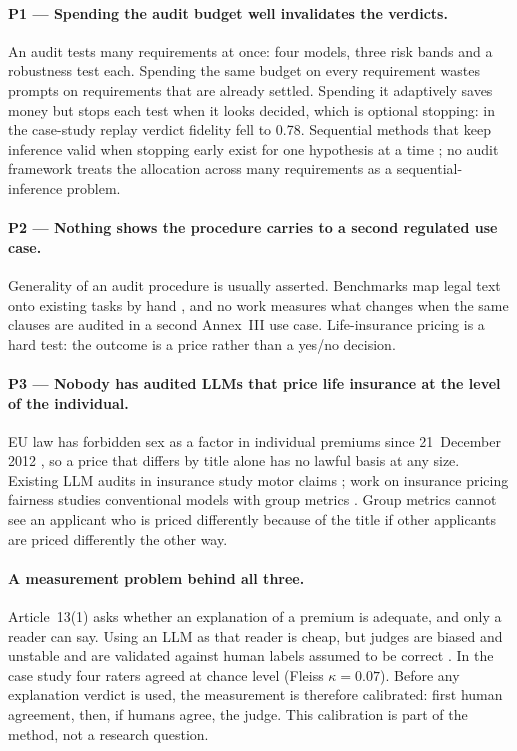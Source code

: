 \paragraph{P1 --- Spending the audit budget well invalidates the verdicts.}\hspace{0.6em}An audit tests many requirements at once: four models, three risk bands and a robustness test each. Spending the same budget on every requirement wastes prompts on requirements that are already settled. Spending it adaptively saves money but stops each test when it looks decided, which is optional stopping: in the case-study replay verdict fidelity fell to 0.78. Sequential methods that keep inference valid when stopping early exist for one hypothesis at a time \citep{obrien1979,landemets,howard,chugg2023}; no audit framework treats the allocation across many requirements as a sequential-inference problem.

\paragraph{P2 --- Nothing shows the procedure carries to a second regulated use case.}\hspace{0.6em}Generality of an audit procedure is usually asserted. Benchmarks map legal text onto existing tasks by hand \citep{complai}, and no work measures what changes when the same clauses are audited in a second Annex~III use case. Life-insurance pricing is a hard test: the outcome is a price rather than a yes/no decision.

\paragraph{P3 --- Nobody has audited LLMs that price life insurance at the level of the individual.}\hspace{0.6em}EU law has forbidden sex as a factor in individual premiums since 21~December 2012 \citep{testachats}, so a price that differs by title alone has no lawful basis at any size. Existing LLM audits in insurance study motor claims \citep{huang2026binary}; work on insurance pricing fairness studies conventional models with group metrics \citep{gupta2025,lindholm2022}. Group metrics cannot see an applicant who is priced differently because of the title if other applicants are priced differently the other way.

\paragraph{A measurement problem behind all three.}\hspace{0.6em}Article~13(1) asks whether an explanation of a premium is adequate, and only a reader can say. Using an LLM as that reader is cheap, but judges are biased and unstable \citep{zheng,wang2023fair,schroeder2024} and are validated against human labels assumed to be correct \citep{calderon2025,bavaresco2025}. In the case study four raters agreed at chance level (Fleiss $\kappa=0.07$). Before any explanation verdict is used, the measurement is therefore calibrated: first human agreement, then, if humans agree, the judge. This calibration is part of the method, not a research question.

